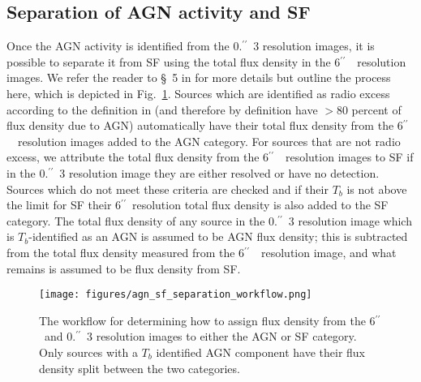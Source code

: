 \documentclass[usenatbib,fleqn,letters]{mnras}
\newcommand{\sarc}{$^{\prime\prime}\!\!$}
\begin{document}
\subsection{Separation of AGN activity and SF}
Once the AGN activity is identified from the 0.\sarc\ 3 resolution images, it is possible to separate it from SF using the total flux density in the 6\sarc\ \ resolution images. We refer the reader to \S~5 in  for more details but outline the process here, which is depicted in Fig.~\ref{fig:flowchart}. Sources which are identified as radio excess according to the definition in  (and therefore by definition have $>$80 percent of flux density due to AGN) automatically have their total flux density from the 6\sarc\ \ resolution images added to the AGN category. For sources that are not radio excess, we attribute the total flux density from the 6\sarc\ \ resolution images to SF if in the 0.\sarc\ 3 resolution image they are either resolved or have no detection. Sources which do not meet these criteria are checked and if their $T_b$ is not above the limit for SF their 6\sarc\ resolution total flux density is also added to the SF category. The total flux density of any source in the 0.\sarc\ 3 resolution image which is $T_b$-identified as an AGN is assumed to be AGN flux density; this is subtracted from the total flux density measured from the 6\sarc\ \ resolution image, and what remains is assumed to be flux density from SF. 

\begin{figure}
    \centering
    \texttt{[image: figures/agn\_sf\_separation\_workflow.png]}
    \caption{The workflow for determining how to assign flux density from the 6\sarc\ and 0.\sarc\ 3 resolution images to either the AGN or SF category. Only sources with a $T_b$ identified AGN component have their flux density split between the two categories.}
    \label{fig:flowchart}
\end{figure}
\end{document}
